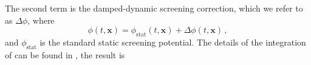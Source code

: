 The second term is the damped-dynamic screening correction, which we refer to as $\Delta \phi$, where
\begin{equation}\label{eq:pos_point}
\phi(t,\boldsymbol{x}) = \phi_{\text{stat}}(t,\boldsymbol{x}) +\Delta \phi(t,\boldsymbol{x}) \,,
\end{equation}
and $\phi_{\text{stat}}$ is the standard static screening potential. The details of the integration of  can be found in \cite{Grayson:2023flr}, the result is


